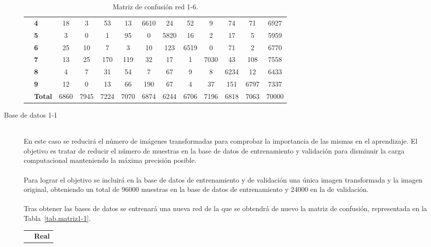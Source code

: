 \begin{description}
\begin{table}[H]
\begin{tabular}{|c|l|c|c|c|c|c|c|c|c|c|c|c|}
			& \textbf{4} & 18 & 3 & 53 & 13 & \cellcolor{lightgray}6610 & 24 & 52 & 9 & 74 & 71 & 6927\\ \cline{2-13}
			& \textbf{5} & 3 & 0 & 1 & 95 & 0 & \cellcolor{lightgray}5820 & 16 & 2 & 17 & 5 &5959\\ \cline{2-13}
			& \textbf{6} & 25 & 10 & 7 & 3 & 10 & 123 & \cellcolor{lightgray}6519 & 0 & 71 & 2 & 6770\\ \cline{2-13}
			& \textbf{7} & 13 & 25 & 170 & 119 & 32 & 17 & 1 & \cellcolor{lightgray}7030 & 43 & 108 & 7558\\ \cline{2-13}
			& \textbf{8} & 4 & 7 & 31 & 54 & 7 & 67 & 9 & 8 & \cellcolor{lightgray}6234 & 12 & 6433\\ \cline{2-13}
			& \textbf{9} & 12 & 0 & 13 & 66 & 190 & 67 & 4 & 37 & 151 & \cellcolor{lightgray}6797 & 7337\\ \cline{2-13}
			& \textbf{Total} & 6860 & 7945 & 7224 & 7070 & 6874 & 6244 & 6706 & 7196 & 6818 & 7063 & 70000\\ \hline
		\end{tabular}
		\caption{Matriz de confusión red 1-6.}
		\label{tab.matriz1-6}
	\end{table}
	\item[Base de datos 1-1] \hfill 
	\vspace{5pt}
	\\
	En este caso se reducirá el número de imágenes transformadas para comprobar la importancia de las mismas en el aprendizaje. El objetivo es tratar de reducir el número de muestras en la base de datos de entrenamiento y validación para disminuir la carga computacional manteniendo la máxima precisión posible.\\
	\vspace{-10pt}
	\\
	Para lograr el objetivo se incluirá en la base de datos de entrenamiento y de validación una única imagen transformada y la imagen original, obteniendo un total de 96000 muestras en la base de datos de entrenamiento y 24000 en la de validación.\\
	\vspace{-10pt}
	\\
	Tras obtener las bases de datos se entrenará una nueva red de la que se obtendrá de nuevo la matriz de confusión, representada en la Tabla~\ref{tab.matriz1-1}.
	\begin{table}[H]
		\centering
		\begin{tabular}{|c|l|c|c|c|c|c|c|c|c|c|c|c|}
			\cline{3-13} 
			\multicolumn{2}{c|}{} & \multicolumn{11}{c|}{\textbf{Real}} \\ \cline{3-13} 

\end{tabular}
\end{table}
\end{description}

